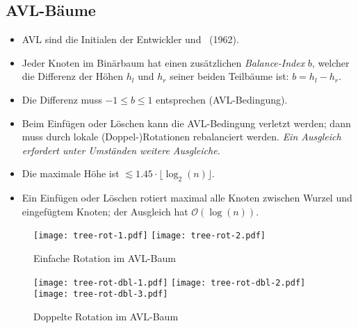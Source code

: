 \subsection{AVL-Bäume}
\begin{itemize}
  \item AVL sind die Initialen der Entwickler  und ~(1962).
  \item Jeder Knoten im Binärbaum hat einen zusätzlichen \emph{Balance-Index} $b$, welcher die Differenz der Höhen $h_l$ und $h_r$ seiner beiden Teilbäume ist: $b = h_l - h_r$.
  \item Die Differenz muss $-1 \leq b \leq 1$ entsprechen (AVL-Bedingung).
  \item Beim Einfügen oder Löschen kann die AVL-Bedingung verletzt werden; dann muss durch lokale (Doppel-)Rotationen rebalanciert werden.
  \emph{Ein Ausgleich erfordert unter Umständen weitere Ausgleiche.}
  \item Die maximale Höhe ist $\apprle 1.45 \cdot \lfloor\log_2(n)\rfloor$.
  \item Ein Einfügen oder Löschen rotiert maximal alle Knoten zwischen Wurzel und eingefügtem Knoten; der Ausgleich hat $\mathcal{O}(\log(n))$.
\end{itemize}

\begin{figure}[htb]
\centering
\texttt{[image: tree-rot-1.pdf]}
\hfil
\texttt{[image: tree-rot-2.pdf]}

\caption{Einfache Rotation im AVL-Baum}
\end{figure}

\begin{figure}[htb]
\centering
\texttt{[image: tree-rot-dbl-1.pdf]}
\hfil
\texttt{[image: tree-rot-dbl-2.pdf]}
\hfil
\texttt{[image: tree-rot-dbl-3.pdf]}

\caption{Doppelte Rotation im AVL-Baum}
\end{figure}


